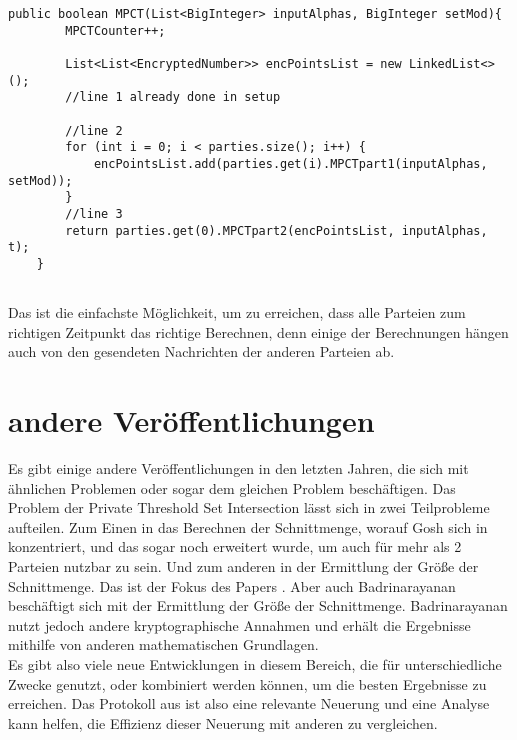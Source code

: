 \begin{lstlisting}
public boolean MPCT(List<BigInteger> inputAlphas, BigInteger setMod){
        MPCTCounter++;

        List<List<EncryptedNumber>> encPointsList = new LinkedList<>();
        //line 1 already done in setup

        //line 2
        for (int i = 0; i < parties.size(); i++) {
            encPointsList.add(parties.get(i).MPCTpart1(inputAlphas, setMod));
        }
        //line 3
        return parties.get(0).MPCTpart2(encPointsList, inputAlphas, t);
    }


\end{lstlisting}

Das ist die einfachste Möglichkeit, um zu erreichen, dass alle Parteien zum richtigen Zeitpunkt das richtige Berechnen, denn einige der Berechnungen hängen auch von den gesendeten Nachrichten der anderen Parteien ab.\\


\section{andere Veröffentlichungen}
Es gibt einige andere Veröffentlichungen in den letzten Jahren, die sich mit ähnlichen Problemen oder sogar dem gleichen Problem beschäftigen.
Das Problem der Private Threshold Set Intersection lässt sich in zwei Teilprobleme aufteilen. Zum Einen in das Berechnen der Schnittmenge, worauf Gosh sich in \cite{Ghosh2019} konzentriert, und das sogar noch erweitert wurde, um auch für mehr als 2 Parteien nutzbar zu sein.\cite{Doettling2021}  Und zum anderen in der Ermittlung der Größe der Schnittmenge. Das ist der Fokus des Papers \cite{Doettling2021}. Aber auch Badrinarayanan \cite{cryptoeprint:2020:600} beschäftigt sich mit der Ermittlung der Größe der Schnittmenge. Badrinarayanan nutzt jedoch andere kryptographische Annahmen und erhält die Ergebnisse mithilfe von anderen mathematischen Grundlagen. \cite{Doettling2021}\\
Es gibt also viele neue Entwicklungen in diesem Bereich, die für unterschiedliche Zwecke genutzt, oder kombiniert werden können, um die besten Ergebnisse zu erreichen. Das Protokoll aus \cite{Doettling2021} ist also eine relevante Neuerung und eine Analyse kann helfen, die Effizienz dieser Neuerung mit anderen zu vergleichen.

